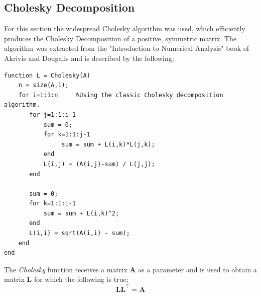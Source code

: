 \documentclass{article}
\begin{document}
\subsection{Cholesky Decomposition}
For this section the widespread Cholesky algorithm was used, which efficiently produces the Cholesky Decomposition of a positive, symmetric matrix. The algorithm was extracted from the "Introduction to Numerical Analysis" book of Akrivis and Dougalis and is described by the following;
\begin{lstlisting}
function L = Cholesky(A)
    n = size(A,1);
    for i=1:1:n     %Using the classic Cholesky decomposition algorithm.
       for j=1:1:i-1
           sum = 0; 
           for k=1:1:j-1
                sum = sum + L(i,k)*L(j,k);
           end
           L(i,j) = (A(i,j)-sum) / L(j,j);
       end
       
       sum = 0;
       for k=1:1:i-1
           sum = sum + L(i,k)^2;
       end
       L(i,i) = sqrt(A(i,i) - sum);
    end
end
\end{lstlisting}
The \emph{Cholesky} function receives a matrix $\mathbf{A}$ as a parameter and is used to obtain a matrix $\mathbf{L}$ for which the following is true;
\[\mathbf{LL^\top = A}\]
\end{document}
